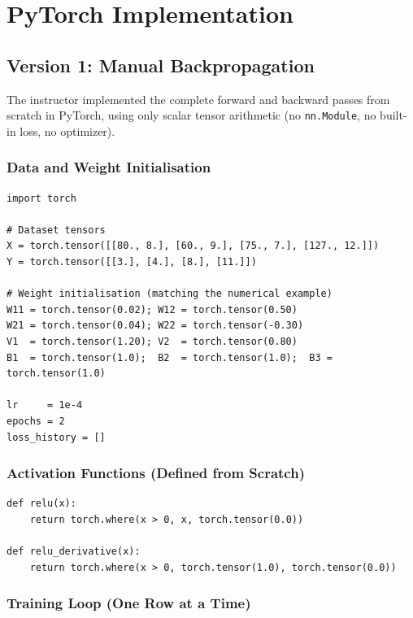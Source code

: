 \documentclass[12pt,a4paper]{article}
\begin{document}
\section{PyTorch Implementation}
\label{sec:pytorch}

\subsection{Version 1: Manual Backpropagation}
\label{sub:manual-backprop}

The instructor implemented the complete forward and backward passes from
scratch in PyTorch, using only scalar tensor arithmetic (no \texttt{nn.Module},
no built-in loss, no optimizer).

\subsubsection{Data and Weight Initialisation}

\begin{verbatim}
import torch

# Dataset tensors
X = torch.tensor([[80., 8.], [60., 9.], [75., 7.], [127., 12.]])
Y = torch.tensor([[3.], [4.], [8.], [11.]])

# Weight initialisation (matching the numerical example)
W11 = torch.tensor(0.02); W12 = torch.tensor(0.50)
W21 = torch.tensor(0.04); W22 = torch.tensor(-0.30)
V1  = torch.tensor(1.20); V2  = torch.tensor(0.80)
B1  = torch.tensor(1.0);  B2  = torch.tensor(1.0);  B3 = torch.tensor(1.0)

lr     = 1e-4
epochs = 2
loss_history = []
\end{verbatim}

\subsubsection{Activation Functions (Defined from Scratch)}

\begin{verbatim}
def relu(x):
    return torch.where(x > 0, x, torch.tensor(0.0))

def relu_derivative(x):
    return torch.where(x > 0, torch.tensor(1.0), torch.tensor(0.0))
\end{verbatim}

\subsubsection{Training Loop (One Row at a Time)}
\end{document}
